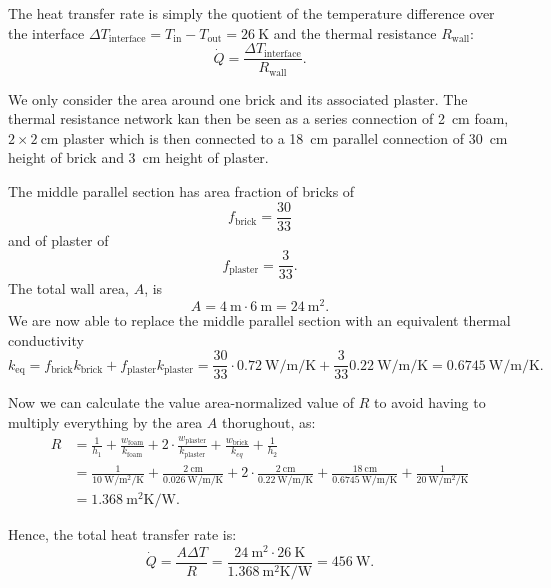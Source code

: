 \begin{derivation}
  The heat transfer rate is simply the quotient of the temperature difference over the interface $\Delta T_{\text{interface}} = T_{\text{in}} - T_{\text{out}} = \qty{26}{\kelvin}$ and the thermal resistance $R_{\text{wall}}$:
  \begin{equation*}
    \dot{Q} = \frac{\Delta T_{\text{interface}}}{R_{\text{wall}}}
  .\end{equation*}

  We only consider the area around one brick and its associated plaster.
  The thermal resistance network kan then be seen as a series connection of \qty{2}{\cm} foam, $2\times\qty{2}{\cm}$ plaster which is then connected to a \qty{18}{\cm} parallel connection of \qty{30}{\cm} height of brick and \qty{3}{\cm} height of plaster.

  The middle parallel section has area fraction of bricks of
  \begin{equation*}
    f_{\text{brick}} = \frac{30}{33}
  \end{equation*}
  and of plaster of
  \begin{equation*}
    f_{\text{plaster}} = \frac{3}{33}
  .\end{equation*}
  The total wall area, $A$, is
  \begin{equation*}
    A = \qty{4}{\m} \cdot \qty{6}{\m} = \qty{24}{\m\squared} 
  .\end{equation*}
  We are now able to replace the middle parallel section with an equivalent thermal conductivity
  \begin{equation*}
    k_{\text{eq}} = f_{\text{brick}} k_{\text{brick}} + f_{\text{plaster}} k_{\text{plaster}} = \frac{30}{33} \cdot \qty{0,72}{\W\per\m\per\K} + \frac{3}{33} \qty{0,22}{\W\per\m\per\K} = \qty{0,6745}{\W\per\m\per\K}
  .\end{equation*}
  
  Now we can calculate the value area-normalized value of $R$ to avoid having to multiply everything by the area $A$ thorughout, as:
  \begin{align*}
    R &= \frac{1}{h_1} + \frac{w_{\text{foam}}}{k_{\text{foam}}} + 2 \cdot \frac{w_{\text{plaster}}}{k_{\text{plaster}}} + \frac{w_{\text{brick}}}{k_{eq}} + \frac{1}{h_2} \\
      &= \frac{1}{\qty{10}{\W\per\m\squared\per\K}} + \frac{\qty{2}{\cm}}{\qty{0,026}{\W\per\m\per\K} } + 2 \cdot \frac{\qty{2}{\cm}}{\qty{0,22}{\W\per\m\per\K}} + \frac{\qty{18}{\cm}}{\qty{0,6745}{\W\per\m\per\K} } + \frac{1}{\qty{20}{\W\per\m\squared\per\K} } \\
      &= \qty{1.368}{\m\squared\K\per\W}
    .\end{align*}
    
    Hence, the total heat transfer rate is:
    \begin{equation*}
      \dot{Q} = \frac{A \Delta T}{R} = \frac{\qty{24}{\m\squared} \cdot \qty{26}{\K}}{\qty{1,368}{\m\squared\K\per\W}} = \qty{456}{\W} 
    .\end{equation*}
\end{derivation}

